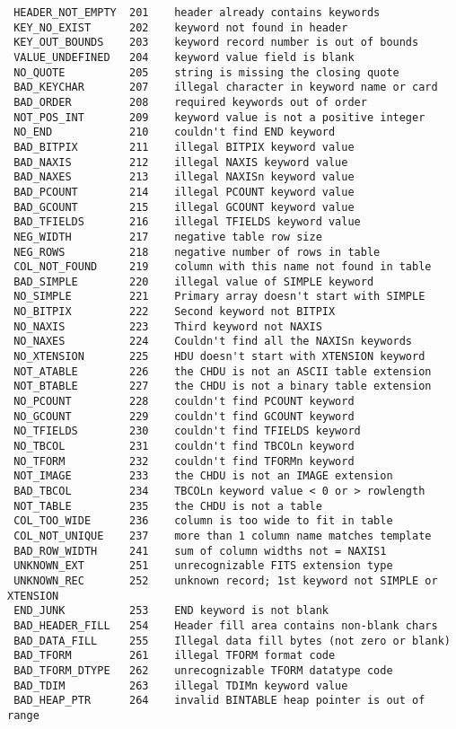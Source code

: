 \documentclass[11pt]{article}
\begin{document}
\begin{verbatim}
 HEADER_NOT_EMPTY  201    header already contains keywords
 KEY_NO_EXIST      202    keyword not found in header
 KEY_OUT_BOUNDS    203    keyword record number is out of bounds
 VALUE_UNDEFINED   204    keyword value field is blank 
 NO_QUOTE          205    string is missing the closing quote
 BAD_KEYCHAR       207    illegal character in keyword name or card
 BAD_ORDER         208    required keywords out of order
 NOT_POS_INT       209    keyword value is not a positive integer
 NO_END            210    couldn't find END keyword
 BAD_BITPIX        211    illegal BITPIX keyword value
 BAD_NAXIS         212    illegal NAXIS keyword value
 BAD_NAXES         213    illegal NAXISn keyword value
 BAD_PCOUNT        214    illegal PCOUNT keyword value
 BAD_GCOUNT        215    illegal GCOUNT keyword value
 BAD_TFIELDS       216    illegal TFIELDS keyword value
 NEG_WIDTH         217    negative table row size
 NEG_ROWS          218    negative number of rows in table
 COL_NOT_FOUND     219    column with this name not found in table
 BAD_SIMPLE        220    illegal value of SIMPLE keyword
 NO_SIMPLE         221    Primary array doesn't start with SIMPLE
 NO_BITPIX         222    Second keyword not BITPIX
 NO_NAXIS          223    Third keyword not NAXIS
 NO_NAXES          224    Couldn't find all the NAXISn keywords
 NO_XTENSION       225    HDU doesn't start with XTENSION keyword
 NOT_ATABLE        226    the CHDU is not an ASCII table extension
 NOT_BTABLE        227    the CHDU is not a binary table extension
 NO_PCOUNT         228    couldn't find PCOUNT keyword
 NO_GCOUNT         229    couldn't find GCOUNT keyword
 NO_TFIELDS        230    couldn't find TFIELDS keyword
 NO_TBCOL          231    couldn't find TBCOLn keyword
 NO_TFORM          232    couldn't find TFORMn keyword
 NOT_IMAGE         233    the CHDU is not an IMAGE extension
 BAD_TBCOL         234    TBCOLn keyword value < 0 or > rowlength
 NOT_TABLE         235    the CHDU is not a table
 COL_TOO_WIDE      236    column is too wide to fit in table
 COL_NOT_UNIQUE    237    more than 1 column name matches template
 BAD_ROW_WIDTH     241    sum of column widths not = NAXIS1
 UNKNOWN_EXT       251    unrecognizable FITS extension type
 UNKNOWN_REC       252    unknown record; 1st keyword not SIMPLE or XTENSION
 END_JUNK          253    END keyword is not blank
 BAD_HEADER_FILL   254    Header fill area contains non-blank chars
 BAD_DATA_FILL     255    Illegal data fill bytes (not zero or blank)
 BAD_TFORM         261    illegal TFORM format code
 BAD_TFORM_DTYPE   262    unrecognizable TFORM datatype code
 BAD_TDIM          263    illegal TDIMn keyword value
 BAD_HEAP_PTR      264    invalid BINTABLE heap pointer is out of range


\end{verbatim}
\end{document}
